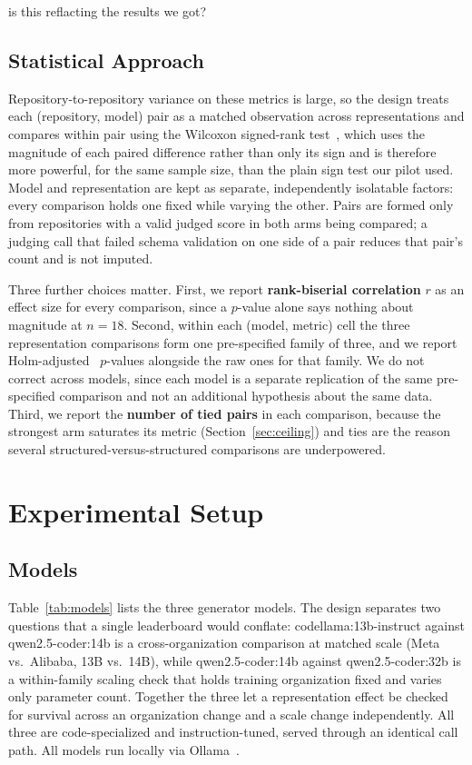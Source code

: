 is this reflacting the results we got?\documentclass[conference]{IEEEtran}
\begin{document}
\subsection{Statistical Approach}
Repository-to-repository variance on these metrics is large, so the design treats each
(repository, model) pair as a matched observation across representations and compares within
pair using the Wilcoxon signed-rank test~\cite{wilcoxon1945individual}, which uses the magnitude
of each paired difference rather than only its sign and is therefore more powerful, for the same
sample size, than the plain sign test our pilot used. Model and representation are kept as
separate, independently isolatable factors: every comparison holds one fixed while varying the
other. Pairs are formed only from repositories with a valid judged score in both arms being
compared; a judging call that failed schema validation on one side of a pair reduces that pair's
count and is not imputed.

Three further choices matter. First, we report \textbf{rank-biserial correlation} $r$ as an
effect size for every comparison, since a $p$-value alone says nothing about magnitude at
$n=18$. Second, within each (model, metric) cell the three representation comparisons form one
pre-specified family of three, and we report Holm-adjusted~\cite{holm1979simple} $p$-values
alongside the raw ones for that family. We do not correct across models, since each model is a
separate replication of the same pre-specified comparison and not an additional hypothesis about
the same data. Third, we report the \textbf{number of tied pairs} in each comparison, because
the strongest arm saturates its metric (Section~\ref{sec:ceiling}) and ties are the reason
several structured-versus-structured comparisons are underpowered.

\section{Experimental Setup}

\subsection{Models}
\label{sec:models}
Table~\ref{tab:models} lists the three generator models. The design separates two questions
that a single leaderboard would conflate: codellama:13b-instruct against qwen2.5-coder:14b is a
cross-organization comparison at matched scale (Meta vs.\ Alibaba, 13B vs.\ 14B), while
qwen2.5-coder:14b against qwen2.5-coder:32b is a within-family scaling check that holds
training organization fixed and varies only parameter count. Together the three let a
representation effect be checked for survival across an organization change and a scale change
independently. All three are code-specialized and instruction-tuned, served through an identical
call path. All models run locally via Ollama~\cite{ollama}.
\end{document}
